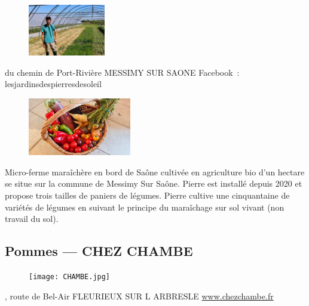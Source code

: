 \documentclass[10pt,a4paper,french]{article}
\makeatletter
\newcommand{\authoredby}[1]{\addtocontents{toc}{\protect\@nameuse{authoredby#1}}}%
\makeatother
\begin{document}
\begin{figure}
\includegraphics[width=0.3\textwidth]{LALAURE1.jpg}
\end{figure}

 du chemin de Port-Rivière MESSIMY SUR SAONE\newline
Facebook\ : lesjardinsdespierresdesoleil\newline

\vspace{6em}

\begin{figure}
\includegraphics[width=0.4\textwidth]{LALAURE2.jpg}
\end{figure}
\noindent Micro-ferme maraîchère en bord de Saône cultivée en agriculture bio
d'un hectare se situe sur la commune de Messimy Sur Saône. Pierre est
installé depuis 2020 et propose trois tailles de paniers de légumes.
Pierre cultive une cinquantaine de variétés de légumes en suivant le
principe du maraîchage sur sol vivant (non travail du sol).

\vspace{10em}

\authoredby{B}
\subsection{Pommes --- CHEZ CHAMBE}\label{subsec:pommes}

\begin{figure}
\texttt{[image: CHAMBE.jpg]}
\end{figure}

, route de Bel-Air FLEURIEUX SUR L ARBRESLE\newline
\href{https://www.chezchambe.fr/}{www.chezchambe.fr}\newline
\end{document}
